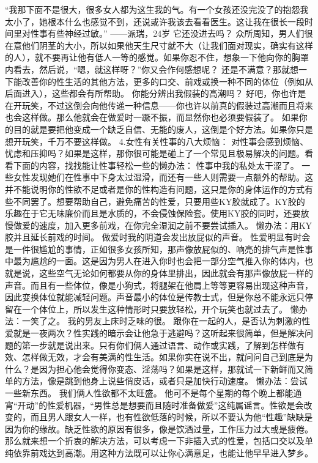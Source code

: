 \documentclass[12pt,UTF8]{ctexbook}
\begin{document}
“我那下面不是很大，很多女人都为这生我的气。有一个女孩还没完没了的抱怨我太小了，她根本什么也感觉不到，还说或许我该去看看医生。这让我在很长一段时间里对性事有些神经过敏。”
——派瑞，24岁
它还没进去吗？
众所周知，男人们很在意他们阴茎的大小，所以如果他天生尺寸就不大（让我们面对现实，确实有这样的人），就不要再让他有低人一等的感觉。如果你忍不住，想象一下他向你的胸罩内看去，然后说，“嗯，就这样呀？”你又会作何感想呢？
还是不满意？那就想一下能改善你的性生活的其他方法，更多的口交、前戏或换一种不同的体位（例如从后面进入），这些都会有所帮助。
你能分辨出我假装的高潮吗？
好吧，你也许是在开玩笑，不过这倒会向他传递一种信息——你也许以前真的假装过高潮而且将来也会这样做。那么他就会在做爱时一蹶不振，而显然你也必须要假装了。
如果你的目的就是要把他变成一个缺乏自信、无能的废人，这倒是个好方法。如果你只是想开玩笑，千万不要这样做。
4.女性有关性事的八大烦恼：
对性事会感到烦恼、忧虑和压抑吗？如果是这样，那你很可能是碰上了一个常见且极易解决的问题。看看下面的内容，找找能让性事轻松一些的懒办法：
性事中我的私处太干涩了。
一些女性发现她们在性事中下身太过湿滑，而还有一些人则需要一点额外的帮助。这并不能说明你的性欲不足或者是你的性构造有问题，这只是你的身体运作的方式有些不同罢了。想要帮助自己，避免痛苦的性爱，只要用些KY胶就成了。KY胶的乐趣在于它无味廉价而且是水质的，不会侵蚀保险套。使用KY胶的同时，还要放慢做爱的速度，加入更多前戏，在你完全湿润之前不要尝试插入。
懒办法：用KY胶并且延长前戏的时间。
做爱时我的阴道会发出放屁似的声音。
性爱明显有时会是一件很尴尬的事情，正如很多女孩所知，那声像放屁似的、响亮的排气声是性事中最为尴尬的一面。这是因为男人在进入你时也会把一部分空气推入你的体内，也就是说，这些空气无论如何都要从你的身体里排出，因此就会有那声像放屁一样的声音。而且有一些体位，像是小狗式，将腿架在他肩上等等更容易出现这种声音，因此变换体位就能减轻问题。声音最小的体位是传教士式，但是你总不能永远只停留在一个体位上，所以发生这种情形时只要放轻松，开个玩笑也就过去了。
懒办法：一笑了之。
我的男友上床时乏味的很。
跟你在一起的人，是否认为刺激的性爱就是一夜两次？性实践的暗示会让他急于逃避吗？这听起来很简单，但是解决问题的第一步就是说出来。只有你们俩人通过语言、动作或实践，了解到怎样做有效、怎样做无效，才会有美满的性生活。如果你实在说不出，就问问自己到底是为什么？是因为担心他会觉得你变态、淫荡吗？如果是这样，那就试一下新鲜而又简单的方法，像是跳到他身上说些俏皮话，或者只是加快行动速度。
懒办法：尝试一些新东西。
我们俩人性欲都不太旺盛。
他可不是每个星期的每个晚上都能通宵“开动”的性爱机器，“男性总是想要而且随时准备做爱”这纯属谣言。性欲是会改变的，而且男人跟女人一样，也有性欲低落的时候，所以不要认为他“性趣”缺缺是因为你的缘故。缺乏性欲的原因有很多，像是饮酒过量，工作压力过大或是疲倦。那么就来想一个折衷的解决方法，可以考虑一下非插入式的性爱，包括口交以及单纯依靠前戏达到高潮。用这种方法既可以让你心满意足，也能让他早早进入梦乡。
\end{document}
